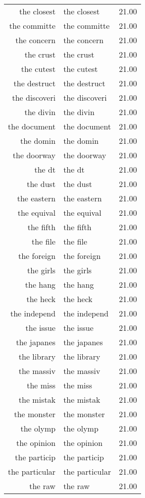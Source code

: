 \begin{table}[ht]
\begin{tabular}{rlr}
  the closest & the closest & 21.00 \\ 
  the committe & the committe & 21.00 \\ 
  the concern & the concern & 21.00 \\ 
  the crust & the crust & 21.00 \\ 
  the cutest & the cutest & 21.00 \\ 
  the destruct & the destruct & 21.00 \\ 
  the discoveri & the discoveri & 21.00 \\ 
  the divin & the divin & 21.00 \\ 
  the document & the document & 21.00 \\ 
  the domin & the domin & 21.00 \\ 
  the doorway & the doorway & 21.00 \\ 
  the dt & the dt & 21.00 \\ 
  the dust & the dust & 21.00 \\ 
  the eastern & the eastern & 21.00 \\ 
  the equival & the equival & 21.00 \\ 
  the fifth & the fifth & 21.00 \\ 
  the file & the file & 21.00 \\ 
  the foreign & the foreign & 21.00 \\ 
  the girls & the girls & 21.00 \\ 
  the hang & the hang & 21.00 \\ 
  the heck & the heck & 21.00 \\ 
  the independ & the independ & 21.00 \\ 
  the issue & the issue & 21.00 \\ 
  the japanes & the japanes & 21.00 \\ 
  the library & the library & 21.00 \\ 
  the massiv & the massiv & 21.00 \\ 
  the miss & the miss & 21.00 \\ 
  the mistak & the mistak & 21.00 \\ 
  the monster & the monster & 21.00 \\ 
  the olymp & the olymp & 21.00 \\ 
  the opinion & the opinion & 21.00 \\ 
  the particip & the particip & 21.00 \\ 
  the particular & the particular & 21.00 \\ 
  the raw & the raw & 21.00 \\ 

\end{tabular}
\end{table}
